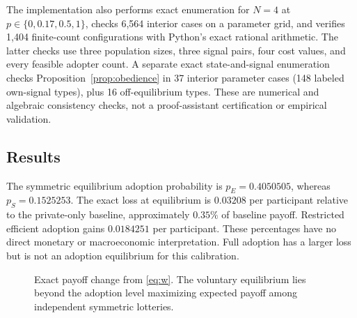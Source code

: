 \documentclass[11pt,a4paper]{article}
\theoremstyle{definition}
\theoremstyle{remark}
\begin{document}
The implementation also performs exact enumeration for $N=4$ at $p\in\{0,0.17,0.5,1\}$, checks 6,564 interior cases on a parameter grid, and verifies 1,404 finite-count configurations with Python's exact rational arithmetic. The latter checks use three population sizes, three signal pairs, four cost values, and every feasible adopter count. A separate exact state-and-signal enumeration checks Proposition~\ref{prop:obedience} in 37 interior parameter cases (148 labeled own-signal types), plus 16 off-equilibrium types. These are numerical and algebraic consistency checks, not a proof-assistant certification or empirical validation.

\subsection{Results}
\begin{table}[tb]
\centering
\small
\caption{Expected payoff and Monte Carlo verification. Payoffs are arbitrary model units per participant; each simulated condition uses 50,000 independent markets.}\label{tab:main}

\end{table}

The symmetric equilibrium adoption probability is $p_E=0.4050505$, whereas $p_S=0.1525253$. The exact loss at equilibrium is $0.03208$ per participant relative to the private-only baseline, approximately $0.35\%$ of baseline payoff. Restricted efficient adoption gains $0.0184251$ per participant. These percentages have no direct monetary or macroeconomic interpretation. Full adoption has a larger loss but is not an adoption equilibrium for this calibration.

\begin{figure}[tb]
\centering
{}
\caption{Exact payoff change from \eqref{eq:w}. The voluntary equilibrium lies beyond the adoption level maximizing expected payoff among independent symmetric lotteries.}\label{fig:curve}
\end{figure}
\end{document}
